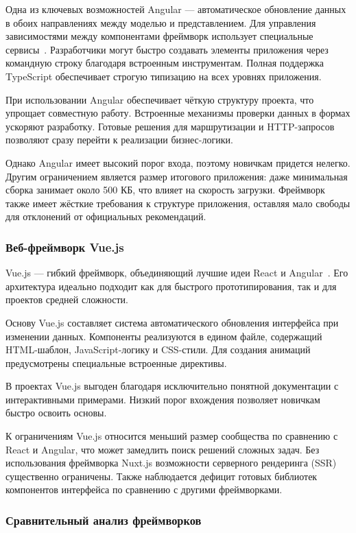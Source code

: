 Одна из ключевых возможностей Angular --- автоматическое обновление данных в обоих направлениях между моделью и представлением. Для управления зависимостями между компонентами фреймворк использует специальные сервисы~\cite{angular_dependency_injection}. Разработчики могут быстро создавать элементы приложения через командную строку благодаря встроенным инструментам. Полная поддержка TypeScript обеспечивает строгую типизацию на всех уровнях приложения.

При использовании Angular обеспечивает чёткую структуру проекта, что упрощает совместную работу. Встроенные механизмы проверки данных в формах ускоряют разработку. Готовые решения для маршрутизации и HTTP-запросов позволяют сразу перейти к реализации бизнес-логики.

Однако Angular имеет высокий порог входа, поэтому новичкам придется нелегко. Другим ограничением является размер итогового приложения: даже минимальная сборка занимает около 500 КБ, что влияет на скорость загрузки. Фреймворк также имеет жёсткие требования к структуре приложения, оставляя мало свободы для отклонений от официальных рекомендаций.

\subsubsection{Веб-фреймворк Vue.js}
Vue.js --- гибкий фреймворк, объединяющий лучшие идеи React и Angular~\cite{vuejs_guide}. Его архитектура идеально подходит как для быстрого прототипирования, так и для проектов средней сложности.

Основу Vue.js составляет система автоматического обновления интерфейса при изменении данных. Компоненты реализуются в едином файле, содержащий HTML-шаблон, JavaScript-логику и CSS-стили. Для создания анимаций предусмотрены специальные встроенные директивы.

В проектах Vue.js выгоден благодаря исключительно понятной документации с интерактивными примерами. Низкий порог вхождения позволяет новичкам быстро освоить основы.

К ограничениям Vue.js относится меньший размер сообщества по сравнению с React и Angular, что может замедлить поиск решений сложных задач. Без использования фреймворка Nuxt.js возможности серверного рендеринга (SSR) существенно ограничены. Также наблюдается дефицит готовых библиотек компонентов интерфейса по сравнению с другими фреймворками.

\subsubsection{Сравнительный анализ фреймворков}


